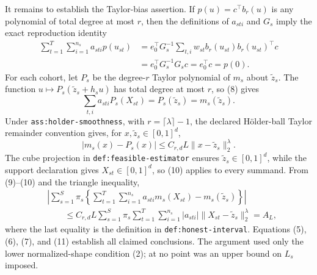 It remains to establish the Taylor-bias assertion.  If \(p(u)=c^{\top}b_r(u)\) is any polynomial of total degree at most \(r\), then the definitions of \(a_{sti}\) and \(G_s\) imply the exact reproduction identity
\[
\begin{aligned}
\sum_{t=1}^{T}\sum_{i=1}^{n_s}a_{sti}p(u_{st})
&=e_0^{\top}G_s^{-1}
  \sum_{t,i}w_{st}b_r(u_{st})b_r(u_{st})^{\top}c\\
&=e_0^{\top}G_s^{-1}G_sc
=e_0^{\top}c
=p(0).
\end{aligned}
\tag{8}
\]
For each cohort, let \(P_s\) be the degree-\(r\) Taylor polynomial of \(m_s\) about \(\widetilde z_s\).  The function \(u\mapsto P_s(\widetilde z_s+h_su)\) has total degree at most \(r\), so (8) gives
\[
\sum_{t,i}a_{sti}P_s(X_{st})=P_s(\widetilde z_s)=m_s(\widetilde z_s).
\tag{9}
\]
Under \texttt{ass:holder-smoothness}, with \(r=\lceil\lambda\rceil-1\), the declared H\"older-ball Taylor remainder convention gives, for \(x,\widetilde z_s\in[0,1]^d\),
\[
|m_s(x)-P_s(x)|
\le C_{r,d}L\|x-\widetilde z_s\|_2^{\lambda}.
\tag{10}
\]
The cube projection in \texttt{def:feasible-estimator} ensures \(\widetilde z_s\in[0,1]^d\), while the support declaration gives \(X_{st}\in[0,1]^d\), so (10) applies to every summand.  From (9)--(10) and the triangle inequality,
\[
\begin{aligned}
&\left|
\sum_{s=1}^{S}\pi_s
\left\{\sum_{t=1}^{T}\sum_{i=1}^{n_s}
a_{sti}m_s(X_{st})-m_s(\widetilde z_s)\right\}
\right|\\
&\qquad\le
C_{r,d}L\sum_{s=1}^{S}\pi_s
\sum_{t=1}^{T}\sum_{i=1}^{n_s}|a_{sti}|
\|X_{st}-\widetilde z_s\|_2^{\lambda}
=A_L,
\end{aligned}
\tag{11}
\]
where the last equality is the definition in \texttt{def:honest-interval}.  Equations (5), (6), (7), and (11) establish all claimed conclusions.  The argument used only the lower normalized-shape condition (2); at no point was an upper bound on \(L_s\) imposed.
